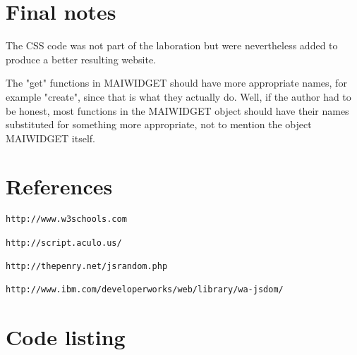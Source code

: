 \documentclass[a4paper,10pt]{article}
\begin{document}
\section{Final notes}
The CSS code was not part of the laboration but were nevertheless added to produce a better resulting website.

The "get" functions in MAIWIDGET should have more appropriate names, for example "create", since that is what they actually do. Well, if the author had to be honest, most functions in the MAIWIDGET object should have their names substituted for something more appropriate, not to mention the object MAIWIDGET itself.

\appendix
\section{References}
\begin{verbatim}
http://www.w3schools.com

http://script.aculo.us/

http://thepenry.net/jsrandom.php

http://www.ibm.com/developerworks/web/library/wa-jsdom/
\end{verbatim}
\section{Code listing}
\end{document}
